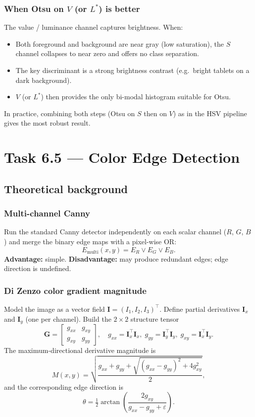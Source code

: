\documentclass[12pt,a4paper]{article}
\begin{document}
\subsubsection{When Otsu on $V$ (or $L^*$) is better}
The value / luminance channel captures brightness.  When:
\begin{itemize}
    \item Both foreground and background are near gray (low saturation), the $S$ channel collapses to near zero and offers no class separation.
    \item The key discriminant is a strong brightness contrast (e.g.\ bright tablets on a dark background).
    \item $V$ (or $L^*$) then provides the only bi-modal histogram suitable for Otsu.
\end{itemize}
In practice, combining both steps (Otsu on $S$ then on $V$) as in the HSV pipeline gives the most robust result.

\section{Task 6.5 — Color Edge Detection}

\subsection{Theoretical background}

\subsubsection{Multi-channel Canny}
Run the standard Canny detector independently on each scalar channel ($R$, $G$, $B$) and merge the binary edge maps with a pixel-wise OR:
\[
E_{\mathrm{multi}}(x,y) = E_R \vee E_G \vee E_B.
\]
\textbf{Advantage:} simple.  \textbf{Disadvantage:} may produce redundant edges; edge direction is undefined.

\subsubsection{Di Zenzo color gradient magnitude}
Model the image as a vector field $\mathbf{I}=(I_1,I_2,I_3)^\top$.  Define partial derivatives $\mathbf{I}_x$ and $\mathbf{I}_y$ (one per channel).  Build the $2\times2$ structure tensor
\[
\mathbf{G} = \begin{bmatrix} g_{xx} & g_{xy} \\ g_{xy} & g_{yy} \end{bmatrix},
\quad
g_{xx}=\mathbf{I}_x^\top\mathbf{I}_x,\;
g_{yy}=\mathbf{I}_y^\top\mathbf{I}_y,\;
g_{xy}=\mathbf{I}_x^\top\mathbf{I}_y.
\]
The maximum-directional derivative magnitude is
\[
M(x,y)=\sqrt{\frac{g_{xx}+g_{yy}+\sqrt{(g_{xx}-g_{yy})^2+4g_{xy}^2}}{2}},
\]
and the corresponding edge direction is
\[
\theta = \tfrac{1}{2}\arctan\!\left(\frac{2g_{xy}}{g_{xx}-g_{yy}+\varepsilon}\right).
\]
\end{document}
